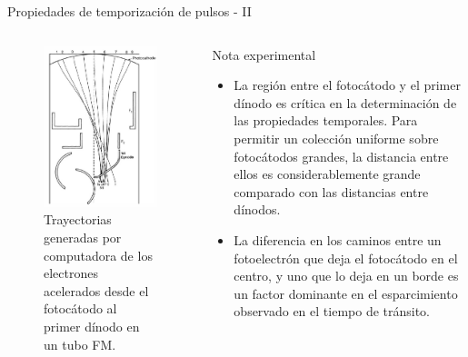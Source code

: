 \documentclass[a4paper,10pt]{beamer}
\begin{document}
\begin{frame}{Propiedades de temporización de pulsos - II}
 
 \begin{columns}[c]
  \column{2in}
  
  \begin{figure}
  \includegraphics[scale=0.4]{fig23}
   \caption{Trayectorias generadas por computadora de los electrones 
   acelerados desde el fotocátodo al primer dínodo en un tubo FM.}
  \end{figure}
  
  \column{2.5in}
  \begin{exampleblock}{Nota experimental}
   \begin{itemize} [<+->]
    \item \begin{justify}
           La región entre el fotocátodo y el primer dínodo es crítica en 
           la determinación de las propiedades temporales. Para permitir 
           un colección uniforme sobre fotocátodos grandes, la distancia 
           entre ellos es considerablemente grande comparado con las distancias 
           entre dínodos.
          \end{justify}
    \item \begin{justify}
           La diferencia en los caminos entre un fotoelectrón que 
           deja el fotocátodo en el centro, y uno que lo deja en un 
           borde es un factor dominante en el esparcimiento observado 
           en el tiempo de tránsito.
          \end{justify}
   \end{itemize}

   
  \end{exampleblock}  
 \end{columns}

\end{frame}
\end{document}
